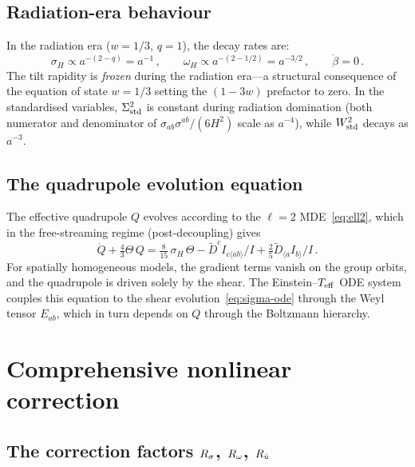 \subsection{Radiation-era behaviour}\label{sec:rad-era}

In the radiation era ($w = 1/3$, $q = 1$), the decay rates are:
\begin{equation}\label{eq:rad-decay}
\sigma_H \propto a^{-(2-q)} = a^{-1}\,,\qquad
\omega_H \propto a^{-(2-1/2)} = a^{-3/2}\,,\qquad
\dot{\beta} = 0\,.
\end{equation}
The tilt rapidity is \emph{frozen} during the radiation era---a
structural consequence of the equation of state $w = 1/3$
setting the $(1 - 3w)$ prefactor to zero.  In the standardised
variables, $\Sigma^2_{\mathrm{std}}$ is constant during radiation domination
(both numerator and denominator of
$\sigma_{ab}\sigma^{ab}/(6H^2)$ scale as $a^{-4}$), while
$W^2_{\mathrm{std}}$ decays as $a^{-3}$.


\subsection{The quadrupole evolution equation}
\label{sec:Q-dot}

The effective quadrupole $Q$ evolves according to the $\ell = 2$
MDE~\eqref{eq:ell2}, which in the free-streaming regime
(post-decoupling) gives
\begin{equation}\label{eq:Q-ode}
\dot{Q} + \tfrac{4}{3}\Theta\,Q
= \tfrac{8}{15}\,\sigma_H\,\Theta
  - \tilde{D}^c I_{c\langle ab\rangle}/I
  + \tfrac{2}{5}\tilde{D}_{\langle a}I_{b\rangle}/I\,.
\end{equation}
For spatially homogeneous models, the gradient terms vanish on
the group orbits, and the quadrupole is driven solely by the
shear.  The Einstein--$T_{\mathrm{eff}}$ ODE system couples this equation
to the shear evolution~\eqref{eq:sigma-ode} through the Weyl
tensor $E_{ab}$, which in turn depends on $Q$ through the
Boltzmann hierarchy.


\section{Comprehensive nonlinear correction}
\label{sec:comprehensive}

\subsection{The correction factors $R_\sigma$, $R_\omega$, $R_{\dot{u}}$}
\label{sec:R-factors}


